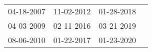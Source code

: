 \begin{supertabular}{llll}
 04-18-2007 &  11-02-2012 &  01-28-2018 \\
 04-03-2009 &  02-11-2016 &  03-21-2019 \\
 08-06-2010 &  01-22-2017 &  01-23-2020 \\
\end{supertabular}
